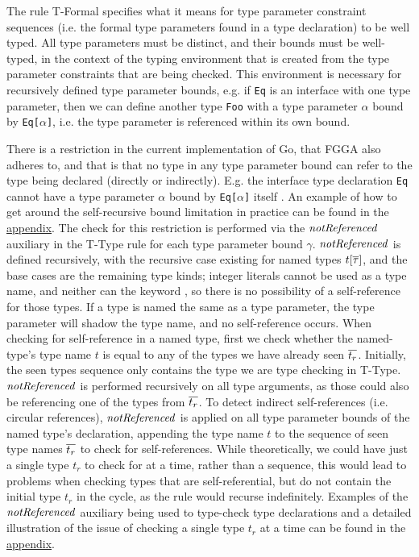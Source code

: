 The rule T-Formal specifies what it means for type parameter constraint
sequences (i.e. the formal type parameters found in a type declaration) to be
well typed. All type parameters must be distinct, and their bounds must be
well-typed, in the context of the typing environment that is created from the
type parameter constraints that are being checked. This environment is necessary
for recursively defined type parameter bounds, e.g. if \texttt{Eq} is an
interface with one type parameter, then we can define another type \texttt{Foo}
with a type parameter $\alpha$ bound by \texttt{Eq[$\alpha$]}, i.e. the type
parameter is referenced within its own bound.

There is a restriction in the current implementation of Go, that FGGA also
adheres to, and that is that no type in any type parameter bound can refer to
the type being declared (directly or indirectly). E.g. the interface type
declaration \texttt{Eq} cannot have a type parameter $\alpha$ bound by
\texttt{Eq[$\alpha$]} itself \autocite{spec}. An example of how to get around
the self-recursive bound limitation in practice can be found in the
\hyperref[sec:self-ref-type-in-bound]{appendix}.
The check for this restriction is performed via the $\mathit{notReferenced}$ auxiliary in the
T-Type rule for each type parameter bound $\gamma$. $\mathit{notReferenced}$ is defined
recursively, with the recursive case existing for named types $t[\overline{\tau}]$,
and the base cases are the remaining type kinds; integer literals cannot be used
as a type name, and neither can the keyword , so there is no
possibility of a self-reference for those types. If a type is named the same as
a type parameter, the type parameter will shadow the type name, and no
self-reference occurs.
When checking for self-reference in a named type, first we check whether the
named-type's type name $t$ is equal to any of the types we have already seen
$\overline{t_r}$. Initially, the seen types sequence only contains the type we are
type checking in T-Type. $\mathit{notReferenced}$ is performed recursively on all type
arguments, as those could also be referencing one of the types from $\overline{t_r}$.
To detect indirect self-references (i.e. circular references), $\mathit{notReferenced}$ is
applied on all type parameter bounds of the named type's declaration, appending
the type name $t$ to the sequence of seen type names $\overline{t_r}$ to check for
self-references. While theoretically, we could have just a single type $t_r$ to
check for at a time, rather than a sequence, this would lead to problems when
checking types that are self-referential, but do not contain the initial type
$t_r$ in the cycle, as the rule would recurse indefinitely. Examples of the
$\mathit{notReferenced}$ auxiliary being used to type-check type declarations and a detailed
illustration of the issue of checking a single type $t_r$ at a time can be found
in the \hyperref[sec:fgg-self-ref-derivation-examples]{appendix}.

